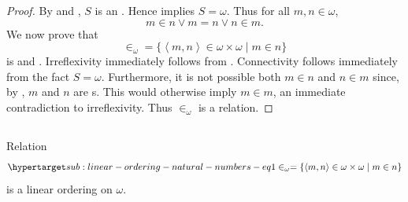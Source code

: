 \documentclass{report}
\newcommand{\pair}[1]{\left< #1 \right>}
\begin{document}
\begin{proof}
    By  and
      , $S$ is an
      .
    Hence  implies $S = \omega$.
    Thus for all $m, n \in \omega$, $$m \in n \lor m = n \lor n \in m.$$
    We now prove that
      $$\in_\omega = \{\pair{m, n} \in \omega \times \omega \mid m \in n\}$$
      is  and .
    Irreflexivity immediately follows from .
    Connectivity follows immediately from the fact $S = \omega$.
    Furthermore, it is not possible both $m \in n$ and $n \in m$ since, by
      , $m$ and $n$ are s.
    This would otherwise imply $m \in m$, an immediate contradiction to
      irreflexivity.
    Thus $\in_\omega$ is a  relation.

\end{proof}

\subsection{}%

\begin{theorem}

  Relation
    \begin{equation}
      \hyperlabel{sub:linear-ordering-natural-numbers-eq1}
      \in_\omega = \{\pair{m, n} \in \omega \times \omega \mid m \in n\}
    \end{equation}
    is a linear ordering on $\omega$.

\end{theorem}
\end{document}
